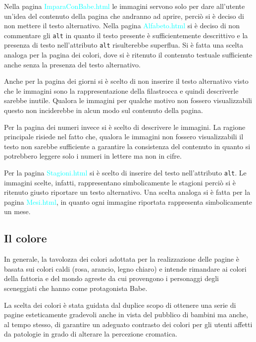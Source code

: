 \documentclass[10pt,a4paper,onecolumn]{article}
\newcommand{\sitepage}[1]{\textcolor{cyan}{\textsf{#1}}}
\begin{document}
Nella pagina \sitepage{ImparaConBabe.html} le immagini servono solo per dare all'utente un'idea del contenuto della pagina che andranno ad aprire, perciò si è deciso di non mettere il testo alternativo. 
Nella pagina \sitepage{Alfabeto.html} si è deciso di non commentare gli \texttt{alt} in quanto il testo presente è sufficientemente descrittivo e la presenza di testo nell'attributo \texttt{alt} risulterebbe superflua.
Si è fatta una scelta analoga per la pagina dei colori, dove si è ritenuto il contenuto testuale sufficiente anche senza la presenza del testo alternativo.

Anche per la pagina dei giorni si è scelto di non inserire il testo alternativo visto che le immagini sono la rappresentazione della filastrocca e quindi descriverle sarebbe inutile.
Qualora le immagini per qualche motivo non fossero visualizzabili questo non inciderebbe in alcun modo sul contenuto della pagina.

Per la pagina dei numeri invece si è scelto di descrivere le immagini.
La ragione principale risiede nel fatto che, qualora le immagini non fossero visualizzabili il testo non sarebbe sufficiente a garantire la consistenza del contenuto in quanto si potrebbero leggere solo i numeri in lettere ma non in cifre.

Per la pagina \sitepage{Stagioni.html} si è scelto di inserire del testo nell'attributo \texttt{alt}. Le immagini scelte, infatti,  rappresentano simbolicamente le stagioni perciò si è ritenuto giusto riportare un testo alternativo.
Una scelta analoga si è fatta per la pagina \sitepage{Mesi.html}, in quanto ogni immagine riportata rappresenta simbolicamente un mese.

\subsection{Il colore}
In generale, la tavolozza dei colori adottata per la realizzazione delle pagine è basata sui colori caldi (rosa, arancio, legno chiaro) e intende rimandare ai colori della fattoria e del mondo agreste da cui provengono i personaggi degli sceneggiati che hanno come protagonista Babe.

La scelta dei colori è stata guidata dal duplice scopo di ottenere una serie di pagine esteticamente gradevoli anche in vista del pubblico di bambini ma anche, al tempo stesso, di garantire un adeguato contrasto dei colori per gli utenti affetti da patologie in grado di alterare la percezione cromatica.
\end{document}
